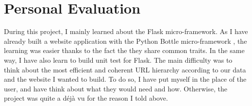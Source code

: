 \documentclass[10pt, a4paper]{article}
\begin{document}
\section{Personal Evaluation}
During this project, I mainly learned about the Flask micro-framework. As I have already built a website application with the Python Bottle micro-framework \cite{bottle}, the learning was easier thanks to the fact the they share common traits. In the same way, I have also learn to build unit test for Flask. The main difficulty was to think about the most efficient and coherent URL hierarchy according to our data and the website I wanted to build. To do so, I have put myself in the place of the user, and have think about what they would need and how. Otherwise, the project was quite a déjà vu for the reason I told above.



		
\end{document}
